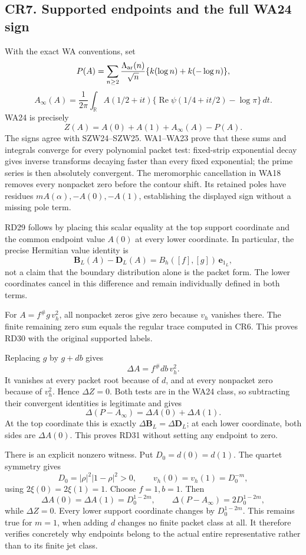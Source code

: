 \documentclass[
]{article}
\begin{document}
\subsection{CR7. Supported endpoints and the full WA24
sign}\label{cr7.-supported-endpoints-and-the-full-wa24-sign}

With the exact WA conventions, set \[
P(A)=\sum_{n\ge2}\frac{\Lambda_{\rm ar}(n)}{\sqrt n}
\{k(\log n)+k(-\log n)\},
\] \[
A_\infty(A)=\frac1{2\pi}\int_{\mathbb R}A(1/2+it)
\{\operatorname{Re}\psi(1/4+it/2)-\log\pi\}\,dt.
\] WA24 is precisely \[
Z(A)=A(0)+A(1)+A_\infty(A)-P(A).
\] The signs agree with SZW24--SZW25. WA1--WA23 prove that these sums
and integrals converge for every polynomial packet test: fixed-strip
exponential decay gives inverse transforms decaying faster than every
fixed exponential; the prime series is then absolutely convergent. The
meromorphic cancellation in WA18 removes every nonpacket zero before the
contour shift. Its retained poles have residues
\(mA(\alpha),-A(0),-A(1)\), establishing the displayed sign without a
missing pole term.

RD29 follows by placing this scalar equality at the top support
coordinate and the common endpoint value \(A(0)\) at every lower
coordinate. In particular, the precise Hermitian value identity is \[
\boldsymbol B_L(A)-\boldsymbol D_L(A)
=B_h([f],[g])\,\mathbf e_{1_L},
\] not a claim that the boundary distribution alone is the packet form.
The lower coordinates cancel in this difference and remain individually
defined in both terms.

For \(A=f^\#g\,v_h^2\), all nonpacket zeros give zero because \(v_h\)
vanishes there. The finite remaining zero sum equals the regular trace
computed in CR6. This proves RD30 with the original supported labels.

Replacing \(g\) by \(g+db\) gives \[
\Delta A=f^\#db\,v_h^2.
\] It vanishes at every packet root because of \(d\), and at every
nonpacket zero because of \(v_h^2\). Hence \(\Delta Z=0\). Both tests
are in the WA24 class, so subtracting their convergent identities is
legitimate and gives \[
\Delta(P-A_\infty)=\Delta A(0)+\Delta A(1).
\] At the top coordinate this is exactly
\(\Delta\boldsymbol B_L=\Delta\boldsymbol D_L\); at each lower
coordinate, both sides are \(\Delta A(0)\). This proves RD31 without
setting any endpoint to zero.

There is an explicit nonzero witness. Put \(D_0=d(0)=d(1)\). The quartet
symmetry gives \[
D_0=|\rho|^2|1-\rho|^2>0,\qquad
v_h(0)=v_h(1)=D_0^{-m},
\] using \(2\xi(0)=2\xi(1)=1\). Choose \(f=1,b=1\). Then \[
\Delta A(0)=\Delta A(1)=D_0^{1-2m},\qquad
\Delta(P-A_\infty)=2D_0^{1-2m},
\] while \(\Delta Z=0\). Every lower support coordinate changes by
\(D_0^{1-2m}\). This remains true for \(m=1\), when adding \(d\) changes
no finite packet class at all. It therefore verifies concretely why
endpoints belong to the actual entire representative rather than to its
finite jet class.
\end{document}
